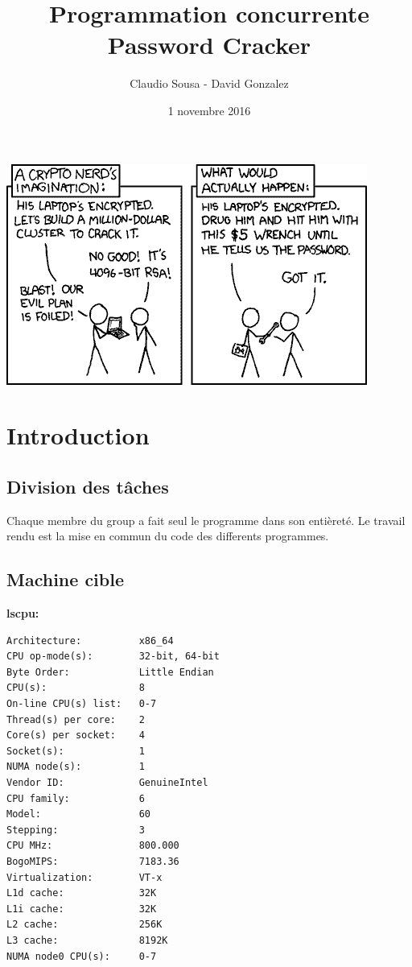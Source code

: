 \documentclass[11pt, a4paper]{article}
\begin{document}
\title
{
    \Huge{Programmation concurrente} \\
    \Huge{Password Cracker}
}
\author
{
	\LARGE{Claudio Sousa - David Gonzalez}
}
\date{1 novembre 2016}
\maketitle

\vspace{50pt}

\begin{center}
    \includegraphics[scale=.8]{frontpage.png}
\end{center}

\thispagestyle{empty}

\newpage

\section{Introduction}
\subsection{Division des tâches}
Chaque membre du group a fait seul le programme dans son entièreté. Le travail rendu est la mise en commun du code des differents programmes.

\subsection{Machine cible}
\textbf{lscpu:}
\begin{lstlisting}
Architecture:          x86_64
CPU op-mode(s):        32-bit, 64-bit
Byte Order:            Little Endian
CPU(s):                8
On-line CPU(s) list:   0-7
Thread(s) per core:    2
Core(s) per socket:    4
Socket(s):             1
NUMA node(s):          1
Vendor ID:             GenuineIntel
CPU family:            6
Model:                 60
Stepping:              3
CPU MHz:               800.000
BogoMIPS:              7183.36
Virtualization:        VT-x
L1d cache:             32K
L1i cache:             32K
L2 cache:              256K
L3 cache:              8192K
NUMA node0 CPU(s):     0-7
\end{lstlisting}
\end{document}
